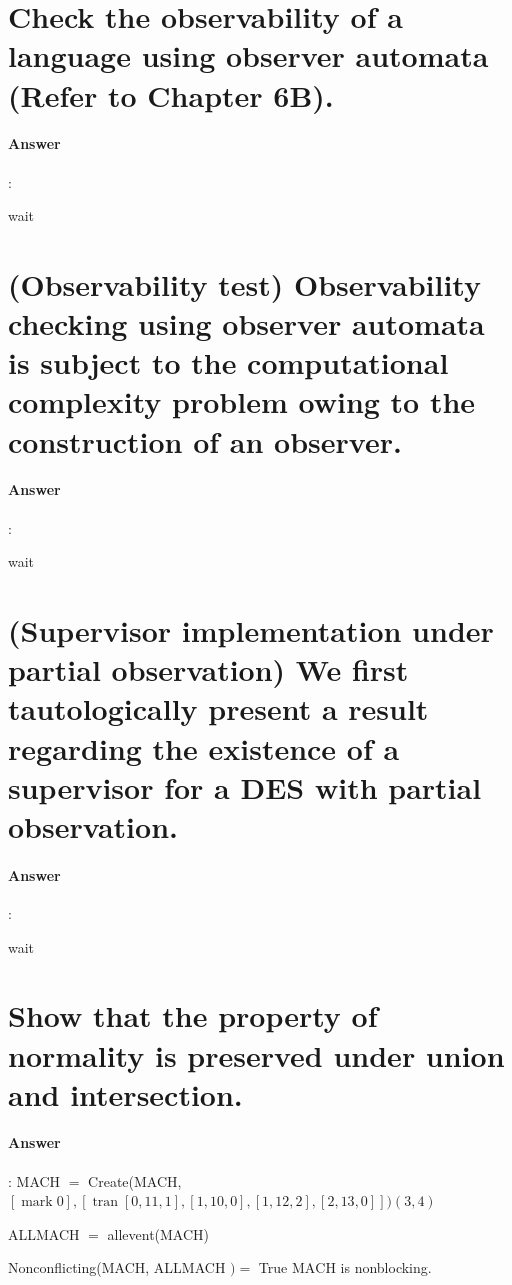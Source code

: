 \documentclass{article}
\begin{document}
\section{Check the observability of a language using observer automata (Refer to Chapter 6B).}

\paragraph{Answer}:

wait

\section{(Observability test) Observability checking using observer automata is subject to the computational complexity problem owing to the construction of an observer.}

\paragraph{Answer}:

wait

\section{(Supervisor implementation under partial observation) We first tautologically present a result regarding the existence of a supervisor for a DES with partial observation.}

\paragraph{Answer}:

wait

\section{Show that the property of normality is preserved under union and intersection.}

\paragraph{Answer}:
MACH $=$ Create(MACH, $[\operatorname{mark} 0],[\operatorname{tran}[0,11,1],[1,10,0],[1,12,2],[2,13,0]])(3,4)$

ALLMACH $=$ allevent(MACH)

Nonconflicting(MACH, ALLMACH $)=$ True $\mathrm{MACH}$ is nonblocking.
\end{document}
